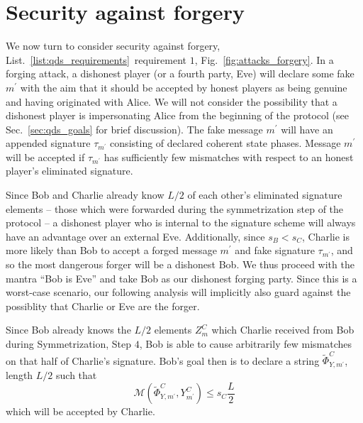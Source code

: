 \section{Security against forgery}\label{sec:qds_security_forgery}
We now turn to consider security against forgery, List.~\ref{list:qds_requirements}~requirement $1$, Fig.~\ref{fig:attacks_forgery}. In a forging attack, a dishonest player (or a fourth party, Eve) will declare some fake $m^\prime$ with the aim that it should be accepted by honest players as being genuine and having originated with Alice. %
We will not consider the possibility that a dishonest player is impersonating Alice from the beginning of the protocol (see Sec.~\ref{sec:qds_goals} for brief discussion). The fake message $m^\prime$ will have an appended signature $\tau_{m^\prime}$ consisting of declared coherent state phases. Message $m^\prime$ will be accepted if $\tau_{m^\prime}$ has sufficiently few mismatches with respect to an honest player's eliminated signature. 


Since Bob and Charlie already know $L/2$ of each other's eliminated signature elements -- those which were forwarded during the symmetrization step of the protocol -- a dishonest player who is internal to the signature scheme will always have an advantage over an external Eve. Additionally, since $s_B < s_C$, Charlie is more likely than Bob to accept a forged message $m^\prime$ and fake signature $\tau_{m^\prime}$, and so the most dangerous forger will be a dishonest Bob. We thus proceed with the mantra ``Bob is Eve'' and take Bob as our dishonest forging party. Since this is a worst-case scenario, our following analysis will implicitly also guard against the possiblity that Charlie or Eve are the forger.

Since Bob already knows the $L/2$ elements $Z_{m}^C$ which Charlie received from Bob during Symmetrization, Step $4$, Bob is able to cause arbitrarily few mismatches on that half of Charlie's signature. Bob's goal then is to declare a string $\tilde{\Phi}^C_{Y, m^\prime}$, length $L/2$ such that 
\begin{equation}\label{eqn:forging_condition}
\mathcal{M}\left(\tilde{\Phi}^C_{Y, m^\prime}, Y_{m^\prime}^C\right) \le s_C \frac{L}{2}
\end{equation}
which will be accepted by Charlie.

